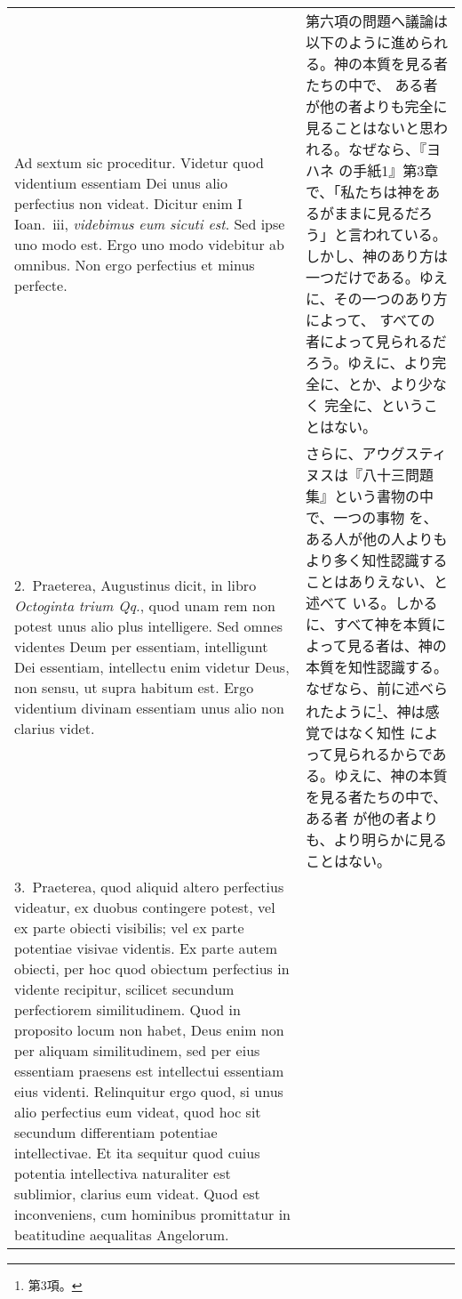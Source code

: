 \documentclass[10pt]{jsarticle} %
\begin{document}
\begin{longtable}{p{21em}p{21em}}
{\sc Ad sextum sic proceditur}. Videtur quod videntium essentiam Dei
unus alio perfectius non videat. Dicitur enim I Ioan.\ {\sc iii}, {\it
videbimus eum sicuti est}. Sed ipse uno modo est. Ergo uno modo
videbitur ab omnibus. Non ergo perfectius et minus perfecte.

&

第六項の問題へ議論は以下のように進められる。神の本質を見る者たちの中で、
ある者が他の者よりも完全に見ることはないと思われる。なぜなら、『ヨハネ
の手紙1』第3章で、「私たちは神をあるがままに見るだろう」と言われている。
しかし、神のあり方は一つだけである。ゆえに、その一つのあり方によって、
すべての者によって見られるだろう。ゆえに、より完全に、とか、より少なく
完全に、ということはない。

\\

2.~{\sc Praeterea}, Augustinus dicit, in libro {\it Octoginta trium
Qq.}, quod unam rem non potest unus alio plus intelligere. Sed omnes
videntes Deum per essentiam, intelligunt Dei essentiam, intellectu
enim videtur Deus, non sensu, ut supra habitum est. Ergo videntium
divinam essentiam unus alio non clarius videt.

&

さらに、アウグスティヌスは『八十三問題集』という書物の中で、一つの事物
を、ある人が他の人よりもより多く知性認識することはありえない、と述べて
いる。しかるに、すべて神を本質によって見る者は、神の本質を知性認識する。
なぜなら、前に述べられたように\footnote{第3項。}、神は感覚ではなく知性
によって見られるからである。ゆえに、神の本質を見る者たちの中で、ある者
が他の者よりも、より明らかに見ることはない。

\\

3.~{\sc Praeterea}, quod aliquid altero perfectius videatur, ex duobus
contingere potest, vel ex parte obiecti visibilis; vel ex parte
potentiae visivae videntis. Ex parte autem obiecti, per hoc quod
obiectum perfectius in vidente recipitur, scilicet secundum
perfectiorem similitudinem. Quod in proposito locum non habet, Deus
enim non per aliquam similitudinem, sed per eius essentiam praesens
est intellectui essentiam eius videnti. Relinquitur ergo quod, si unus
alio perfectius eum videat, quod hoc sit secundum differentiam
potentiae intellectivae. Et ita sequitur quod cuius potentia
intellectiva naturaliter est sublimior, clarius eum videat. Quod est
inconveniens, cum hominibus promittatur in beatitudine aequalitas
Angelorum.


\end{longtable}
\end{document}
